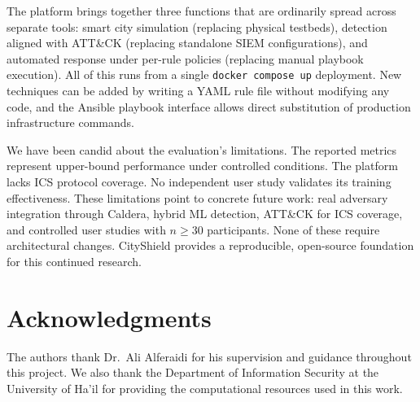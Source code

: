 \documentclass[conference,10pt]{IEEEtran}
\begin{document}
The platform brings together three functions that are ordinarily spread across separate tools: smart city simulation (replacing physical testbeds), detection aligned with ATT\&CK (replacing standalone SIEM configurations), and automated response under per-rule policies (replacing manual playbook execution). All of this runs from a single \texttt{docker compose up} deployment. New techniques can be added by writing a YAML rule file without modifying any code, and the Ansible playbook interface allows direct substitution of production infrastructure commands.

We have been candid about the evaluation's limitations. The reported metrics represent upper-bound performance under controlled conditions. The platform lacks ICS protocol coverage. No independent user study validates its training effectiveness. These limitations point to concrete future work: real adversary integration through Caldera, hybrid ML detection, ATT\&CK for ICS coverage, and controlled user studies with $n \geq 30$ participants. None of these require architectural changes. CityShield provides a reproducible, open-source foundation for this continued research.

\section*{Acknowledgments}

The authors thank Dr.\ Ali Alferaidi for his supervision and guidance throughout this project. We also thank the Department of Information Security at the University of Ha'il for providing the computational resources used in this work.

\balance

\end{document}
